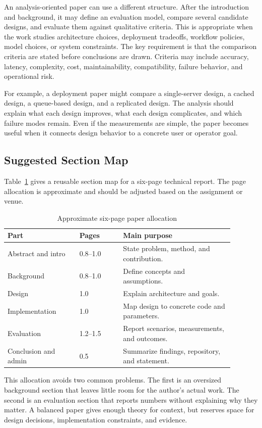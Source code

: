 An analysis-oriented paper can use a different structure. After the introduction and background, it may define an evaluation model, compare several candidate designs, and evaluate them against qualitative criteria. This is appropriate when the work studies architecture choices, deployment tradeoffs, workflow policies, model choices, or system constraints. The key requirement is that the comparison criteria are stated before conclusions are drawn. Criteria may include accuracy, latency, complexity, cost, maintainability, compatibility, failure behavior, and operational risk.

For example, a deployment paper might compare a single-server design, a cached design, a queue-based design, and a replicated design. The analysis should explain what each design improves, what each design complicates, and which failure modes remain. Even if the measurements are simple, the paper becomes useful when it connects design behavior to a concrete user or operator goal.

\subsection{Suggested Section Map}

Table~\ref{tab:section-map} gives a reusable section map for a six-page technical report. The page allocation is approximate and should be adjusted based on the assignment or venue.

\begin{table}[H]
\centering
\footnotesize
\setlength{\tabcolsep}{3pt}
\caption{Approximate six-page paper allocation}
\label{tab:section-map}
\begin{tabular}{@{}p{0.29\linewidth}p{0.17\linewidth}p{0.43\linewidth}@{}}
\toprule
\textbf{Part} & \textbf{Pages} & \textbf{Main purpose} \\
\midrule
Abstract and intro & 0.8--1.0 & State problem, method, and contribution. \\
Background & 0.8--1.0 & Define concepts and assumptions. \\
Design & 1.0 & Explain architecture and goals. \\
Implementation & 1.0 & Map design to concrete code and parameters. \\
Evaluation & 1.2--1.5 & Report scenarios, measurements, and outcomes. \\
Conclusion and admin & 0.5 & Summarize findings, repository, and statement. \\
\bottomrule
\end{tabular}
\normalsize
\end{table}

This allocation avoids two common problems. The first is an oversized background section that leaves little room for the author's actual work. The second is an evaluation section that reports numbers without explaining why they matter. A balanced paper gives enough theory for context, but reserves space for design decisions, implementation constraints, and evidence.
